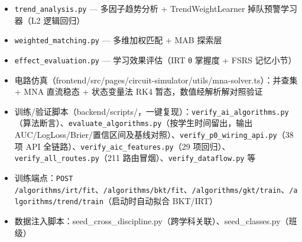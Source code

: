 \documentclass[zihao=-4,a4paper,UTF8,fontset=windows]{ctexart}
\begin{document}
\begin{itemize}[leftmargin=2em,itemsep=0pt,topsep=0pt]
\item \texttt{trend\_\allowbreak{}analysis.\allowbreak{}py} — 多因子趋势分析 + TrendWeightLearner 掉队预警学习器（L2 逻辑回归）
\end{itemize}
\begin{itemize}[leftmargin=2em,itemsep=0pt,topsep=0pt]
\item \texttt{weighted\_\allowbreak{}matching.\allowbreak{}py} — 多维加权匹配 + MAB 探索层
\end{itemize}
\begin{itemize}[leftmargin=2em,itemsep=0pt,topsep=0pt]
\item \texttt{effect\_\allowbreak{}evaluation.\allowbreak{}py} — 学习效果评估（IRT θ 掌握度 + FSRS 记忆小节）
\end{itemize}
\begin{itemize}[leftmargin=2em,itemsep=0pt,topsep=0pt]
\item 电路仿真（frontend/src/pages/circuit-simulator/utils/mna-solver.ts）：并查集 + MNA 直流稳态 + 状态变量法 RK4 暂态，数值经解析解对照验证
\end{itemize}
\begin{itemize}[leftmargin=2em,itemsep=0pt,topsep=0pt]
\item 训练/验证脚本（backend/scripts/，一键复现）：\texttt{verify\_\allowbreak{}ai\_\allowbreak{}algorithms.\allowbreak{}py}（算法断言）、\texttt{evaluate\_\allowbreak{}algorithms.\allowbreak{}py}（按学生时间留出，输出 AUC/LogLoss/Brier/置信区间及基线对照）、\texttt{verify\_\allowbreak{}p0\_\allowbreak{}wiring\_\allowbreak{}api.\allowbreak{}py}（38 项 API 全链路）、\texttt{verify\_\allowbreak{}aic\_\allowbreak{}features.\allowbreak{}py}（29 项回归）、\texttt{verify\_\allowbreak{}all\_\allowbreak{}routes.\allowbreak{}py}（211 路由冒烟）、\texttt{verify\_\allowbreak{}dataflow.\allowbreak{}py} 等
\end{itemize}
\begin{itemize}[leftmargin=2em,itemsep=0pt,topsep=0pt]
\item 训练端点：\texttt{POST /\allowbreak{}algorithms/\allowbreak{}irt/\allowbreak{}fit}、\texttt{/\allowbreak{}algorithms/\allowbreak{}bkt/\allowbreak{}fit}、\texttt{/\allowbreak{}algorithms/\allowbreak{}gkt/\allowbreak{}train}、\texttt{/\allowbreak{}algorithms/\allowbreak{}trend/\allowbreak{}train}（启动时自动拟合 BKT/IRT）
\end{itemize}
\begin{itemize}[leftmargin=2em,itemsep=0pt,topsep=0pt]
\item 数据注入脚本：seed\_cross\_discipline.py（跨学科关联）、seed\_classes.py（班级）
\end{itemize}
\end{document}
